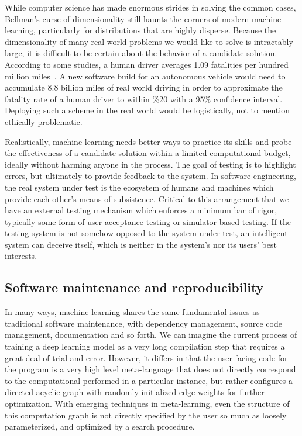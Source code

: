\documentclass[12pt,initial,twoside,maitrise]{dms}
\numberwithin{equation}{section}
\numberwithin{table}{chapter}
\numberwithin{figure}{chapter}
\begin{document}
While computer science has made enormous strides in solving the common cases, Bellman's curse of dimensionality still haunts the corners of modern machine learning, particularly for distributions that are highly disperse. Because the dimensionality of many real world problems we would like to solve is intractably large, it is difficult to be certain about the behavior of a candidate solution. According to some studies, a human driver averages 1.09 fatalities per hundred million miles~\cite{kalra2016driving}. A new software build for an autonomous vehicle would need to accumulate 8.8 billion miles of real world driving in order to approximate the fatality rate of a human driver to within \%20 with a 95\% confidence interval. Deploying such a scheme in the real world would be logistically, not to mention ethically problematic.

Realistically, machine learning needs better ways to practice its skills and probe the effectiveness of a candidate solution within a limited computational budget, ideally without harming anyone in the process. The goal of testing is to highlight errors, but ultimately to provide feedback to the system. In software engineering, the real system under test is the ecosystem of humans and machines which provide each other's means of subsistence. Critical to this arrangement that we have an external testing mechanism which enforces a minimum bar of rigor, typically some form of user acceptance testing or simulator-based testing. If the testing system is not somehow opposed to the system under test, an intelligent system can deceive itself, which is neither in the system's nor its users' best interests.

\subsection{Software maintenance and reproducibility}

In many ways, machine learning shares the same fundamental issues as traditional software maintenance, with dependency management, source code management, documentation and so forth. We can imagine the current process of training a deep learning model as a very long compilation step that requires a great deal of trial-and-error. However, it differs in that the user-facing code for the program is a very high level meta-language that does not directly correspond to the computational performed in a particular instance, but rather configures a directed acyclic graph with randomly initialized edge weights for further optimization. With emerging techniques in meta-learning, even the structure of this computation graph is not directly specified by the user so much as loosely parameterized, and optimized by a search procedure.
\end{document}
